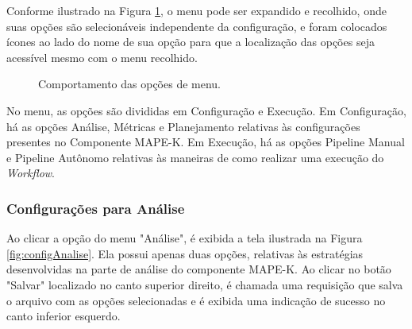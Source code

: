 \documentclass[portugues]{ic-tese}
\begin{document}
Conforme ilustrado na Figura \ref{fig:opcoesMenu}, o menu pode ser expandido e recolhido, onde suas opções são selecionáveis independente da configuração, e foram colocados ícones ao lado do nome de sua opção para que a localização das opções seja acessível mesmo com o menu recolhido.

\begin{figure}[H]
    \centering
    \caption{Comportamento das opções de menu.}
    \label{fig:opcoesMenu}
\end{figure}

No menu, as opções são divididas em Configuração e Execução. Em Configuração, há as opções Análise, Métricas e Planejamento relativas às configurações presentes no Componente MAPE-K. Em Execução, há as opções Pipeline Manual e Pipeline Autônomo relativas às maneiras de como realizar uma execução do \textit{Workflow}.

\subsubsection{Configurações para Análise}

Ao clicar a opção do menu "Análise", é exibida a tela ilustrada na Figura \ref{fig:configAnalise}. Ela possui apenas duas opções, relativas às estratégias desenvolvidas na parte de análise do componente MAPE-K. Ao clicar no botão "Salvar" localizado no canto superior direito, é chamada uma requisição que salva o arquivo com as opções selecionadas e é exibida uma indicação de sucesso no canto inferior esquerdo.
\end{document}
